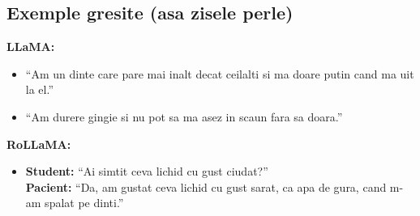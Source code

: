 \documentclass{article}
\begin{document}
\subsection{Exemple gresite (asa zisele perle)}

\textbf{LLaMA:}
\begin{itemize}
    \item ``Am un dinte care pare mai inalt decat ceilalti si ma doare putin cand ma uit la el.''
    \item ``Am durere gingie si nu pot sa ma asez in scaun fara sa doara.''
\end{itemize}


\textbf{RoLLaMA:}
\begin{itemize}
    \item \textbf{Student:} ``Ai simtit ceva lichid cu gust ciudat?'' \\
    \textbf{Pacient:} ``Da, am gustat ceva lichid cu gust sarat, ca apa de gura, cand m-am spalat pe dinti.''
\end{itemize}
\end{document}
